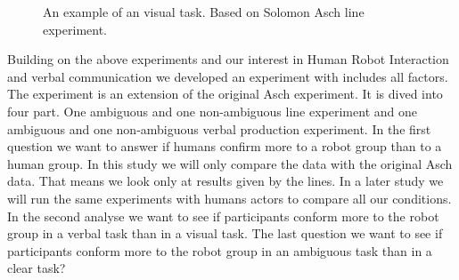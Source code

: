 \documentclass{acm_proc_article-sp}
\begin{document}
\begin{figure}
\centering
{}
\caption{An example of an visual task. Based on Solomon Asch line experiment.\cite{asch1951effects}}
\label{fig:asch1}
\end{figure}


Building on the above experiments and our interest in Human Robot Interaction and verbal communication we developed an experiment with includes all factors. The experiment is an extension of the original Asch experiment. It is dived into four part. One ambiguous and one non-ambiguous line experiment and one ambiguous and one non-ambiguous verbal production experiment. In the first question we want to answer if humans confirm more to a robot group than to a human group. In this study we will only compare the data with the original Asch data. That means we look only at results given by the lines. In a later study we will run the same experiments with humans actors to compare all our conditions. In the second analyse we want to see if participants conform more to the robot group in a verbal task than in a visual task. The last question we want to see if participants conform more to the robot group in an ambiguous task than in a clear task?






\end{document}
